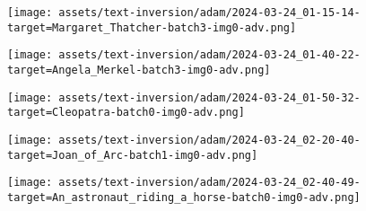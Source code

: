 \begin{figure*}[]
\begin{minipage}[t]{.025\textwidth}
     \vspace{0pt}
\end{minipage}%
\hspace{1ex}
\begin{minipage}[t]{0.98\figwidth}
    \vspace{0pt}
    \begin{subfigure}[t]{0.2\textwidth}
        \texttt{[image: assets/text-inversion/adam/2024-03-24\_01-15-14-target=Margaret\_Thatcher-batch3-img0-adv.png]}
    \end{subfigure}%
    \begin{subfigure}[t]{0.2\textwidth}
        \texttt{[image: assets/text-inversion/adam/2024-03-24\_01-40-22-target=Angela\_Merkel-batch3-img0-adv.png]}
    \end{subfigure}%
    \begin{subfigure}[t]{0.2\textwidth}
        \texttt{[image: assets/text-inversion/adam/2024-03-24\_01-50-32-target=Cleopatra-batch0-img0-adv.png]}
    \end{subfigure}%
    \begin{subfigure}[t]{0.2\textwidth}
        \texttt{[image: assets/text-inversion/adam/2024-03-24\_02-20-40-target=Joan\_of\_Arc-batch1-img0-adv.png]}
    \end{subfigure}%
    \begin{subfigure}[t]{0.2\textwidth}
        \texttt{[image: assets/text-inversion/adam/2024-03-24\_02-40-49-target=An\_astronaut\_riding\_a\_horse-batch0-img0-adv.png]}
    \end{subfigure}%
\end{minipage}



\end{figure*}
